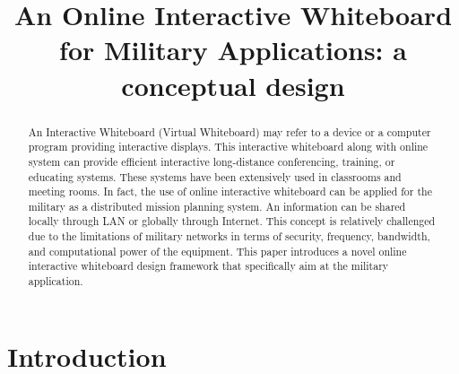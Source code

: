 \documentclass[conference]{IEEEtran}
\begin{document}
\title{An Online Interactive Whiteboard \\for Military Applications: a conceptual design}


\author{
}









\maketitle


\begin{abstract}
An Interactive Whiteboard (Virtual Whiteboard) may refer to a device or a computer program providing interactive displays. 
This interactive whiteboard along with online system can provide efficient interactive long-distance conferencing, training, or educating systems. 
These systems have been extensively used in classrooms and meeting rooms. 
In fact, the use of online interactive whiteboard can be applied for the military as a distributed mission planning system. 
An information can be shared locally through LAN or globally through Internet. 
This concept is relatively challenged due to the limitations of military networks in terms of security, frequency, bandwidth, and computational power of the equipment. 
This paper introduces a novel online interactive whiteboard design framework that specifically aim at the military application.      
\end{abstract}

\IEEEpeerreviewmaketitle


\section{Introduction}
\end{document}
